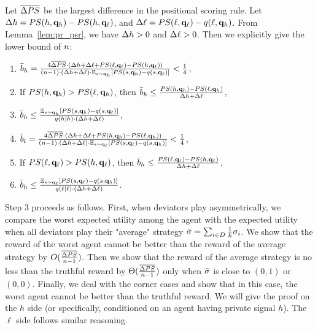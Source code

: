
Let $\overline{\Delta PS}$ be the largest difference in the positional scoring rule. Let $\Delta h = PS(h, \mathbf{q}_h) - PS(h, \mathbf{q}_\ell)$, and $\Delta \ell = PS(\ell, \mathbf{q}_{\ell}) - q(\ell, \mathbf{q}_h)$. From Lemma~\ref{lem:pr_psr}, we have $\Delta h > 0$ and $\Delta \ell > 0$. Then we explicitly give the lower bound of $n$:

\begin{enumerate}
    \item $\bar{b}_h = \frac{4\overline{\Delta PS}\cdot (\Delta h + \Delta \ell + PS(\ell, \mathbf{q}_{\ell}) - PS(h, \mathbf{q}_\ell))}{ (n - 1)\cdot (\Delta h +\Delta \ell)\cdot  \mathbb{E}_{s \sim \mathbf{q}_h}[PS(s, \mathbf{q}_h) - q(s, \mathbf{q}_\ell)]} < \frac14$, 
    \item If $PS(h, \mathbf{q}_h) > PS(\ell, \mathbf{q}_h)$, then $\bar{b}_h \le \frac{PS(h, \mathbf{q}_h) - PS(\ell, \mathbf{q}_h)}{\Delta h + \Delta \ell}$, 
    \item $\bar{b}_h \le \frac{\mathbb{E}_{s \sim \mathbf{q}_h}[PS(s, \mathbf{q}_h) - q(s, \mathbf{q}_\ell)]}{q(h\mid h)\cdot (\Delta h + \Delta \ell)}$,
    \item $\bar{b}_l = \frac{4\overline{\Delta PS}\cdot (\Delta h + \Delta \ell + PS(h, \mathbf{q}_{h}) - PS(\ell, \mathbf{q}_h))}{ (n - 1)\cdot (\Delta h +\Delta \ell)\cdot  \mathbb{E}_{s \sim \mathbf{q}_\ell}[PS(s, \mathbf{q}_\ell) - q(s, \mathbf{q}_h)]} < \frac14$, 
    \item If $PS(\ell, \mathbf{q}_{\ell}) > PS(h, \mathbf{q}_\ell)$, then $\bar{b}_h \le \frac{PS(\ell, \mathbf{q}_{\ell}) - PS(h, \mathbf{q}_\ell)}{\Delta h + \Delta \ell}$, 
    \item $\bar{b}_h \le \frac{\mathbb{E}_{s \sim \mathbf{q}_\ell}[PS(s, \mathbf{q}_\ell) - q(s, \mathbf{q}_h)]}{q(\ell \mid \ell)\cdot (\Delta h + \Delta \ell)}$.
\end{enumerate}


Step 3 proceeds as follows. First, when deviators play asymmetrically, we compare the worst expected utility among the agent with the expected utility when all deviators play their "average" strategy $\bar{\sigma} = \sum_{i\in D} \frac{1}{k} \sigma_i$. We show that the reward of the worst agent cannot be better than the reward of the average strategy by $O (\frac{\overline{\Delta PS}}{n - 1})$. Then we show that the reward of the average strategy is no less than the truthful reward by $\Theta (\frac{\overline{\Delta PS}}{n - 1})$ only when $\bar{\sigma}$ is close to $(0, 1)$ or $(0, 0)$. Finally, we deal with the corner cases and show that in this case, the worst agent cannot be better than the truthful reward. We will give the proof on the $h$ side (or specifically, conditioned on an agent having private signal $h$). The $\ell$ side follows similar reasoning. 

